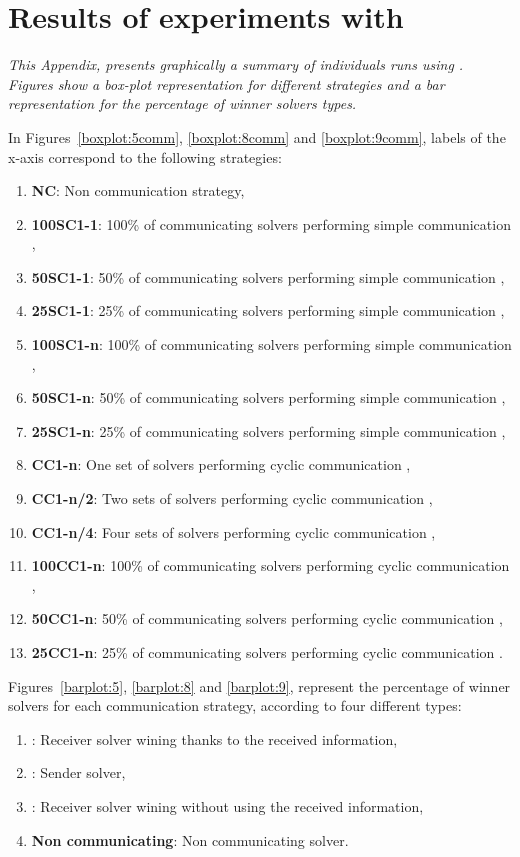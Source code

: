 \chapter{Results of experiments with \sgp}
\label{app:sgp}
\textit{This Appendix, presents graphically a summary of individuals runs using \sgp. Figures show a \textit{box-plot} representation for different strategies and a bar representation for the percentage of winner solvers types.}
\vfill
\newpage

In Figures~\ref{boxplot:5comm}, \ref{boxplot:8comm} and \ref{boxplot:9comm}, labels of the x-axis correspond to the following strategies:
\begin{enumerate}[itemsep=-1mm]
\item \textbf{NC}: Non communication strategy, 
\item \textbf{100SC1-1}: 100\% of communicating solvers performing simple communication \oneTone, 
\item \textbf{50SC1-1}: 50\% of communicating solvers performing simple communication \oneTone,
\item \textbf{25SC1-1}: 25\% of communicating solvers performing simple communication \oneTone,
\item \textbf{100SC1-n}: 100\% of communicating solvers performing simple communication \oneTn, 
\item \textbf{50SC1-n}: 50\% of communicating solvers performing simple communication \oneTn,
\item \textbf{25SC1-n}: 25\% of communicating solvers performing simple communication \oneTn,
\item \textbf{CC1-n}: One set of solvers performing cyclic communication \oneTn, 
\item \textbf{CC1-n/2}: Two sets of solvers performing cyclic communication \oneTn,
\item \textbf{CC1-n/4}: Four sets of solvers performing cyclic communication \oneTn,
\item \textbf{100CC1-n}: 100\% of communicating solvers performing cyclic communication \oneTone, 
\item \textbf{50CC1-n}: 50\% of communicating solvers performing cyclic communication \oneTone,
\item \textbf{25CC1-n}: 25\% of communicating solvers performing cyclic communication \oneTone.
\end{enumerate}

Figures~\ref{barplot:5}, \ref{barplot:8} and \ref{barplot:9}, represent the percentage of winner solvers for each communication strategy, according to four different types:
\begin{enumerate}[itemsep=-1mm]
\item {}: Receiver solver wining thanks to the received information, 
\item {}: Sender solver, 
\item {}: Receiver solver wining without using the received information,
\item \textbf{Non communicating}: Non communicating solver.
\end{enumerate}


